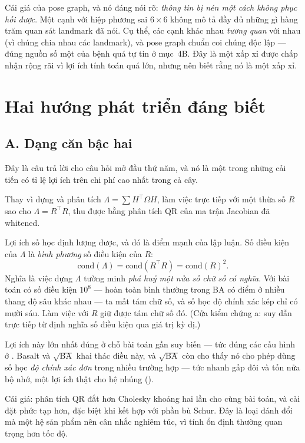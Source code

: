 \documentclass[../../vslam.tex]{subfiles}
\begin{document}
Cái giá của pose graph, và nó đáng nói rõ: \emph{thông tin bị nén một cách không phục hồi được}. Một cạnh với hiệp phương sai \(6\times6\) không mô tả đầy đủ những gì hàng trăm quan sát landmark đã nói. Cụ thể, các cạnh khác nhau \emph{tương quan} với nhau (vì chúng chia nhau các landmark), và pose graph chuẩn coi chúng độc lập --- đúng nguồn số một của bệnh quá tự tin ở  mục~4B. Đây là một xấp xỉ được chấp nhận rộng rãi vì lợi ích tính toán quá lớn, nhưng nên biết rằng nó là một xấp xỉ.

\section{Hai hướng phát triển đáng biết}

\subsection{A. Dạng căn bậc hai}

Đây là câu trả lời cho câu hỏi mở đầu thứ năm, và nó là một trong những cải tiến có tỉ lệ lợi ích trên chi phí cao nhất trong cả cây.

Thay vì dựng và phân tích \(\Lambda = \sum H^\top \Omega H\), làm việc trực tiếp với một thừa số \(R\) sao cho \(\Lambda = R^{\top}R\), thu được bằng phân tích QR của ma trận Jacobian đã whitened.

Lợi ích số học định lượng được, và đó là điểm mạnh của lập luận. Số điều kiện của \(\Lambda\) là \emph{bình phương} số điều kiện của \(R\):
\[
\mathrm{cond}(\Lambda) = \mathrm{cond}(R^{\top}R) = \mathrm{cond}(R)^2 .
\]
Nghĩa là việc dựng \(\Lambda\) tường minh \emph{phá huỷ một nửa số chữ số có nghĩa}. Với bài toán có số điều kiện \(10^8\) --- hoàn toàn bình thường trong BA có điểm ở nhiều thang độ sâu khác nhau --- ta mất tám chữ số, và số học độ chính xác kép chỉ có mười sáu. Làm việc với \(R\) giữ được tám chữ số đó. (Cửa kiểm chứng a: suy dẫn trực tiếp từ định nghĩa số điều kiện qua giá trị kỳ dị.)

Lợi ích này lớn nhất đúng ở chỗ bài toán gần suy biến --- tức đúng các cấu hình ở . Basalt \cite{usenko2020basalt} và \(\sqrt{\text{BA}}\) \cite{demmel2021rootba} khai thác điều này, và \(\sqrt{\text{BA}}\) còn cho thấy nó cho phép dùng số học \emph{độ chính xác đơn} trong nhiều trường hợp --- tức nhanh gấp đôi và tốn nửa bộ nhớ, một lợi ích thật cho hệ nhúng ().

Cái giá: phân tích QR đắt hơn Cholesky khoảng hai lần cho cùng bài toán, và cài đặt phức tạp hơn, đặc biệt khi kết hợp với phần bù Schur. Đây là loại đánh đổi mà một hệ sản phẩm nên cân nhắc nghiêm túc, vì tính ổn định thường quan trọng hơn tốc độ.
\end{document}
